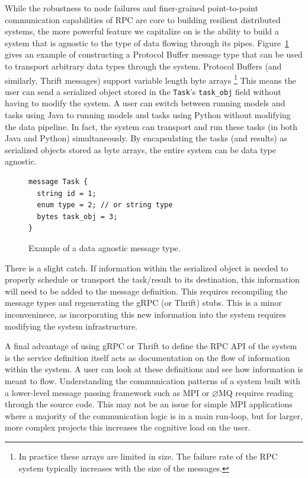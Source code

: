 \documentclass[conference]{IEEEtran}
\begin{document}
While the robustness to node failures and finer-grained point-to-point
communication capabilities of RPC are core to building resilient distributed
systems, the more powerful feature we capitalize on is the ability to build a
system that is agnostic to the type of data flowing through its
pipes. Figure~\ref{fig:data-agnostic} gives an example of constructing a
Protocol Buffer message type that can be used to transport arbitrary data types
through the system. Protocol Buffers (and similarly, Thrift messages) support
variable length byte arrays
\footnote{In practice these arrays are limited in size. The failure rate of the
  RPC system typically increases with the size of the messages.} This means the
user can send a serialized object stored in the \texttt{Task}'s
\texttt{task\_obj} field without having to modify the system.  A user can switch
between running models and tasks using Java to running models and tasks using
Python without modifying the data pipeline. In fact, the system can transport
and run these tasks (in both Java and Python) simultaneously. By encapsulating
the tasks (and results) as serialized objects stored as byte arrays, the entire
system can be data type agnostic.

\begin{figure}
  \begin{lstlisting}
message Task {
  string id = 1;
  enum type = 2; // or string type
  bytes task_obj = 3;
}
  \end{lstlisting}
  \caption{Example of a data agnostic message type.}\label{fig:data-agnostic}
\end{figure}

There is a slight catch. If information within the serialized object
is needed to properly schedule or transport the task/result to its
destination, this information will need to be added to the message
definition. This requires recompiling the message types and regenerating
the gRPC (or Thrift) stubs. This is a minor inconveninece, as incorporating
this new information into the system requires modifying the system
infrastructure.

A final advantage of using gRPC or Thrift to define the RPC API of the system is
the service definition itself acts as documentation on the flow of information
within the system. A user can look at these definitions and see how information
is meant to flow. Understanding the communication patterns of a system built
with a lower-level message passing framework such as MPI or $\varnothing$MQ requires
reading through the source code. This may not be an issue for simple MPI applications
where a majority of the communication logic is in a main run-loop, but for larger,
more complex projects this increases the cognitive load on the user.
\end{document}
